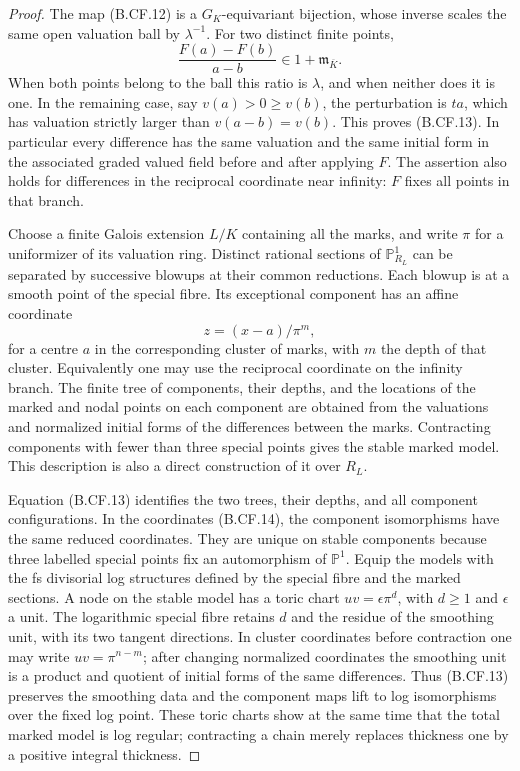 \documentclass[11pt,a4paper]{article}
\begin{document}
\begin{proof}
The map (B.CF.12) is a \(G_K\)-equivariant bijection, whose inverse
scales the same open valuation ball by \(\lambda^{-1}\).
For two distinct finite points,
\[
          \frac{F(a)-F(b)}{a-b}\in1+\mathfrak m_{\overline K}.
                                                        \tag{B.CF.13}
\]
When both points belong to the ball this ratio is \(\lambda\), and
when neither does it is one. In the remaining case, say
\(v(a)>0\geq v(b)\), the perturbation is \(ta\), which has
valuation strictly larger than \(v(a-b)=v(b)\). This proves
(B.CF.13). In particular every difference has the same valuation and
the same initial form in the associated graded valued field before
and after applying \(F\). The assertion also holds for differences
in the reciprocal coordinate near infinity: \(F\) fixes all points
in that branch.

Choose a finite Galois extension \(L/K\) containing all the marks,
and write \(\pi\) for a uniformizer of its valuation ring. Distinct
rational sections of \(\mathbb P^1_{R_L}\) can be separated by
successive blowups at their common reductions. Each blowup is at a
smooth point of the special fibre. Its exceptional component has an
affine coordinate
\[
                          z=(x-a)/\pi^m,                 \tag{B.CF.14}
\]
for a centre \(a\) in the corresponding cluster of marks, with
\(m\) the depth of that cluster. Equivalently one may use the
reciprocal coordinate on the infinity branch. The finite tree of
components, their depths, and the locations of the marked and nodal
points on each component are obtained from the valuations and
normalized initial forms of the differences between the marks.
Contracting components with fewer than three special points gives
the stable marked model. This description is also a direct
construction of it over \(R_L\).

Equation (B.CF.13) identifies the two trees, their depths, and all
component configurations. In the coordinates (B.CF.14), the
component isomorphisms have the same reduced coordinates. They are
unique on stable components because three labelled special points
fix an automorphism of \(\mathbb P^1\). Equip the models with the
fs divisorial log structures defined by the special fibre and the
marked sections. A node on the stable model has a toric chart
\(uv=\epsilon\pi^d\), with \(d\geq1\) and \(\epsilon\) a
unit. The logarithmic special fibre retains \(d\) and the residue
of the smoothing unit, with its two tangent directions. In cluster
coordinates before contraction one may write
\(uv=\pi^{n-m}\); after changing normalized coordinates the
smoothing unit is a product and quotient of initial forms of the
same differences. Thus (B.CF.13) preserves the smoothing data and
the component maps lift to log isomorphisms over the fixed log point.
These toric charts show at the same time that the total marked model
is log regular; contracting a chain merely replaces thickness one
by a positive integral thickness.


\end{proof}
\end{document}
